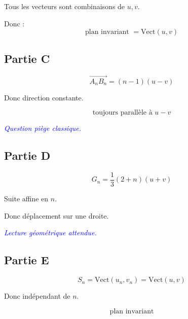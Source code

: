 \documentclass[11pt,a4paper]{article}
\newcommand{\commentaire}[1]{\textcolor{blue}{\textit{#1}}}
\begin{document}
Tous les vecteurs sont combinaisons de $u,v$.

Donc :
\[
\boxed{\text{plan invariant } = \mathrm{Vect}(u,v)}
\]


\subsection*{Partie C}

\[
\overrightarrow{A_nB_n}=(n-1)(u-v)
\]

Donc direction constante.

\[
\boxed{\text{toujours parallèle à } u-v}
\]

\commentaire{Question piège classique.}


\subsection*{Partie D}

\[
G_n=\frac{1}{3}(2+n)(u+v)
\]

Suite affine en $n$.

Donc déplacement sur une droite.

\commentaire{Lecture géométrique attendue.}


\subsection*{Partie E}

\[
S_n=\mathrm{Vect}(u_n,v_n)=\mathrm{Vect}(u,v)
\]

Donc indépendant de $n$.

\[
\boxed{\text{plan invariant}}
\]
\end{document}
